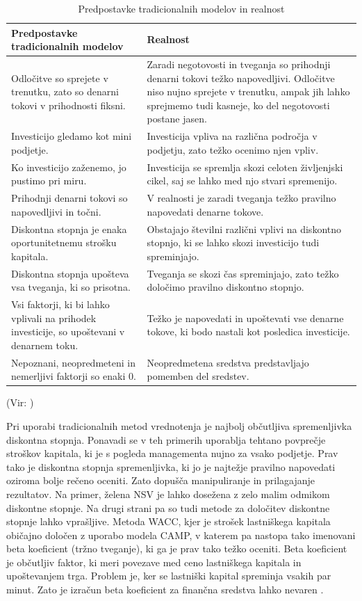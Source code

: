 \pagebreak
\begin{table}[ht]
	\caption{Predpostavke tradicionalnih modelov in realnost}
	\centering
	\begin{tabular}{|L|L|}
	\hline
	\textbf{Predpostavke tradicionalnih modelov} & \textbf{Realnost} \\
	\hline
	\hline
	Odločitve so sprejete v trenutku, zato so denarni tokovi v prihodnosti fiksni. & Zaradi negotovosti in tveganja so prihodnji denarni tokovi težko napovedljivi. Odločitve niso nujno sprejete v trenutku, ampak jih lahko sprejmemo tudi kasneje, ko del negotovosti postane jasen. \\
	\hline
	Investicijo gledamo kot mini podjetje. &  Investicija vpliva na različna področja v podjetju, zato težko ocenimo njen vpliv. \\
	\hline
	Ko investicijo zaženemo, jo pustimo pri miru. & Investicija se spremlja skozi celoten življenjski cikel, saj se lahko med njo stvari spremenijo. \\
	\hline
	Prihodnji denarni tokovi so napovedljivi in točni. & V realnosti je zaradi tveganja težko pravilno napovedati denarne tokove. \\
	\hline
	Diskontna stopnja je enaka oportunitetnemu strošku kapitala. & Obstajajo številni različni vplivi na diskontno stopnjo, ki se lahko skozi investicijo tudi spreminjajo.\\
	\hline
	Diskontna stopnja upošteva vsa tveganja, ki so prisotna. & Tveganja se skozi čas spreminjajo, zato težko določimo pravilno diskontno stopnjo. \\
	\hline
	Vsi faktorji, ki bi lahko vplivali na prihodek investicije, so upoštevani v denarnem toku. & Težko je napovedati in upoštevati vse denarne tokove, ki bodo nastali kot posledica investicije. \\
	\hline
	Nepoznani, neopredmeteni in nemerljivi faktorji so enaki 0. & Neopredmetena sredstva predstavljajo pomemben del sredstev. \\
	\hline
	\end{tabular}
\end{table} 
(Vir: \cite[str. 67]{Mun})



Pri uporabi tradicionalnih metod vrednotenja je najbolj občutljiva spremenljivka diskontna stopnja. Ponavadi se v teh primerih uporablja tehtano povprečje stroškov kapitala, ki je s pogleda managementa nujno za vsako podjetje. Prav tako je diskontna stopnja spremenljivka, ki jo je najtežje pravilno napovedati oziroma bolje rečeno oceniti. Zato dopušča manipuliranje in prilagajanje rezultatov. Na primer, želena NSV je lahko dosežena z zelo malim odmikom diskontne stopnje. Na drugi strani pa so tudi metode za določitev diskontne stopnje lahko vprašljive. Metoda WACC, kjer je strošek lastniškega kapitala običajno določen z uporabo modela CAMP, v katerem pa nastopa tako imenovani beta koeficient (tržno tveganje), ki ga je prav tako težko oceniti. Beta koeficient je občutljiv faktor, ki meri povezave med ceno lastniškega kapitala in upoštevanjem trga. Problem je, ker se lastniški kapital spreminja vsakih par minut. Zato je izračun beta koeficient za finančna sredstva lahko nevaren \cite[str. 69, 70]{Mun}.\\
 
